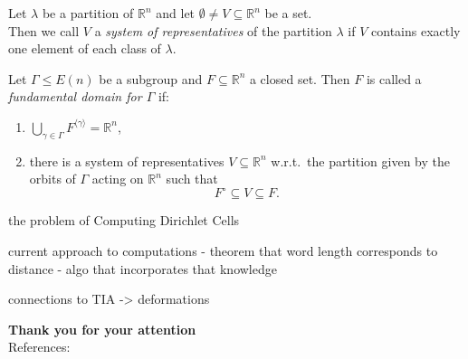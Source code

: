 \documentclass{beamer}
\theoremstyle{plain}
\newcommand\R{\mathbb R}
\begin{document}
\begin{frame}
    \begin{definition}\label{def:system-of-reps}
        Let $\lambda$ be a partition of $\R^n$ and let $\emptyset \neq V \subseteq \R^n$ be a set.\\ \pause
        Then we call $V$ a \emph{system of representatives} of the partition $\lambda$ if $V$ contains exactly one element of each class of $\lambda$.
    \end{definition} \pause

    \begin{definition}\label{def:fund-dom}
        Let $\Gamma \leq E(n)$ be a subgroup and $F \subseteq \R^n$ a closed set.
        Then $F$ is called a \emph{fundamental domain for $\Gamma$} if:\pause
        \begin{enumerate}[label=(\roman*)]
            \item $\bigcup_{\gamma \in \Gamma} F^{\langle \gamma \rangle} = \R^n$, \pause
            \item there is a system of representatives $V \subseteq \R^n$ w.r.t.\ the partition given by the orbits of $\Gamma$ acting on $\R^n$ such that $$F^\circ \subseteq V \subseteq F.$$
        \end{enumerate}
    \end{definition}
\end{frame}

\begin{frame}
    the problem of Computing Dirichlet Cells
\end{frame}

\begin{frame}
    current approach to computations
        - theorem that word length corresponds to distance 
        - algo that incorporates that knowledge
\end{frame}

\begin{frame}
    connections to TIA -> deformations
\end{frame}

\begin{frame}
    \textbf{\Large Thank you for your attention}\\ 
    \bigskip
    References:\\
    \printbibliography
\end{frame}
\end{document}
